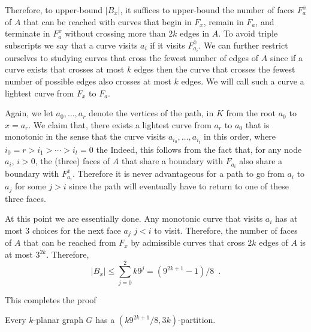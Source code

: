\documentclass{patmorin}
\begin{document}
Therefore, to upper-bound $|B_x|$, it suffices to upper-bound the number of faces $F^{\bar{x}}_a$ of $A$ that can be reached with curves that begin in $F_x$, remain in $F_a$, and terminate in $F^{\bar{x}}_a$ without crossing more than $2k$ edges in $A$.  To avoid triple subscripts we say that a curve visits $a_i$ if it visits $F^{\bar{x}}_{a_i}$.  We can further restrict ourselves to studying curves that cross the fewest number of edges of $A$ since if a curve exists that crosses at most $k$ edges then the curve that crosses the fewest number of possible edges also crosses at most $k$ edges.  We will call such a curve a lightest curve from $F_x$ to $F_a$.

Again, we let $a_0,\ldots,a_r$ denote the vertices of the path, in $K$ from the root $a_0$ to $x=a_r$.  We claim that, there exists a lightest curve from $a_r$ to $a_0$ that is monotonic in the sense that the curve visits $a_{i_0},\ldots,a_{i_t}$ in this order, where $i_0=r > i_1>\cdots>i_t=0$ the Indeed, this follows from the fact that, for any node $a_i$, $i>0$, the (three) faces of $A$ that share a boundary with $F_{a_i}$ also share a boundary with $F^{\bar{x}}_{a_i}$.  Therefore it is never advantageous for a path to go from $a_i$ to $a_j$ for some $j>i$ since the path will eventually have to return to one of these three faces.

At this point we are essentially done.  Any monotonic curve that visits $a_i$ has at most 3 choices for the next face $a_j$ $j<i$ to visit.  Therefore, the number of faces of $A$ that can be reached from $F_x$ by admissible curves that cross $2k$ edges of $A$ is at most $3^{2k}$. Therefore,
\[
   |B_x| \le \sum_{j=0}^2k 9^j = (9^{2k+1}-1)/8 \enspace .
\]

This completes the proof

\begin{thm}
    Every $k$-planar graph $G$ has a $(k9^{2k+1}/8,3k)$-partition.
\end{thm}



\end{document}
